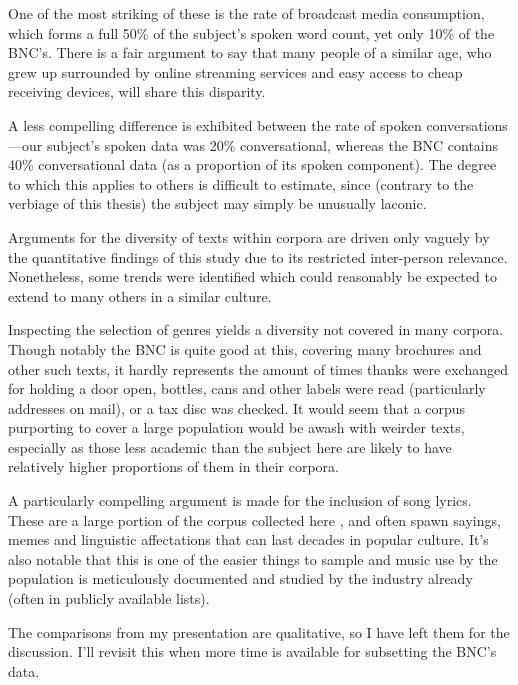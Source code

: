 One of the most striking of these is the rate of broadcast media consumption, which forms a full 50\% of the subject's spoken word count, yet only 10\% of the BNC's.  There is a fair argument to say that many people of a similar age, who grew up surrounded by online streaming services and easy access to cheap receiving devices, will share this disparity.

A less compelling difference is exhibited between the rate of spoken conversations---our subject's spoken data was 20\% conversational, whereas the BNC contains 40\% conversational data (as a proportion of its spoken component).  The degree to which this applies to others is difficult to estimate, since (contrary to the verbiage of this thesis) the subject may simply be unusually laconic.



Arguments for the diversity of texts within corpora are driven only vaguely by the quantitative findings of this study due to its restricted inter-person relevance.  Nonetheless, some trends were identified which could reasonably be expected to extend to many others in a similar culture.

Inspecting the selection of genres yields a diversity not covered in many corpora.  Though notably the BNC is quite good at this, covering many brochures and other such texts, it hardly represents the amount of times thanks were exchanged for holding a door open, bottles, cans and other labels were read (particularly addresses on mail), or a tax disc was checked.  It would seem that a corpus purporting to cover a large population would be awash with weirder texts, especially as those less academic than the subject here are likely to have relatively higher proportions of them in their corpora.

A particularly compelling argument is made for the inclusion of song lyrics.  These are a large portion of the corpus collected here , and often spawn sayings, memes and linguistic affectations that can last decades in popular culture.  It's also notable that this is one of the easier things to sample and music use by the population is meticulously documented and studied by the industry already (often in publicly available lists).



The comparisons from my presentation are qualitative, so I have left them for the discussion.  I'll revisit this when more time is available for subsetting the BNC's data.


